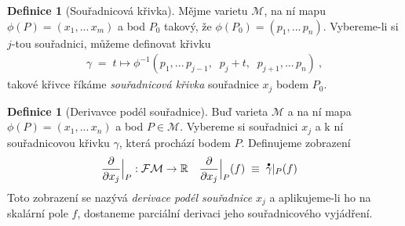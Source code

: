 \documentclass{article}
\theoremstyle{definition}
\newtheorem{definition}[theorem]{Definice}
\newcommand{\pd}[2]{\frac{\partial  #1}{\partial  #2}}
\renewcommand{\dot}[1]{\accentset{\bullet}{#1}}
\newcommand{\R}{\mathbb{R}}
\def\Manif{\mathcal{M}}
\def\Func{\mathcal{F}}
\begin{document}
\begin{definition}[Souřadnicová křivka]
Mějme varietu $\Manif$, na ní mapu $\phi(P) = (x_1, ... \, x_m)$ a bod $P_0$ takový, že $\phi(P_0) = (p_1, ... \, p_n)$. Vybereme-li si $j$-tou souřadnici, můžeme definovat křivku
\begin{align*}
    \gamma \;=\;
    t \mapsto
    \phi^{-1}(p_1, ... \, p_{j-1}, \;\; p_j + t, \;\; p_{j+1}, ... \, p_n)
    \: ,
\end{align*}
takové křivce říkáme \textit{souřadnicová křivka} souřadnice $x_j$ bodem $P_0$.
\label{def:souradnicova-krivka}
\end{definition}

\begin{definition}[Derivavce podél souřadnice]
    Buď varieta $\Manif$ a na ní mapa $\phi(P) = (x_1, ... \, x_n)$ a bod $P\in\Manif$. Vybereme si souřadnici $x_j$ a k ní souřadnicovou křivku $\gamma$, která prochází bodem $P$. Definujeme zobrazení
    \begin{align*}
        \pd{}{x_j} \Big|_P &:
        \Func\Manif \to \R
        &
        \pd{}{x_j} \Big|_P (f)
        \;&\equiv\;
        \dot\gamma|_P(f)
    \end{align*}
    Toto zobrazení se nazývá \textit{derivace podél souřadnice} $x_j$ a aplikujeme-li ho na skalární pole $f$, dostaneme parciální derivaci jeho souřadnicového vyjádření.
\end{definition}
\end{document}
